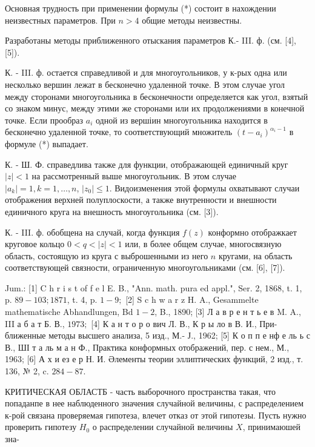 \documentclass[10pt]{article}
\begin{document}
Основная трудность при применении формулы (*) состоит в нахождении неизвестных параметров. При $n>4$ общие методы неизвестны.



Разработаны методы приближенного отыскания параметров К.- III. ф. (см. [4], [5]).



К. - III. ф. остается справедливой и для многоугольников, у к-рых одна или несколько вершин лежат в бесконечно удаленной точке. В этом случае угол между сторонами многоугольника в бесконечности определяется как угол, взятый со знаком минус, между этими же сторонами или их продолжениями в конечной точке. Если прообраз $a_{i}$ одной из вершіин многоугольника находится в бесконечно удаленной точке, то соответствующий множитель $\left(t-a_{i}\right)^{\alpha_{i}-1}$ в формуле (*) выпадает.



К. - Ш. Ф. справедлива также для функции, отображающей единичный круг $|z|<1$ на рассмотренный выше многоугольник. В этом случае $\left|a_{k}\right|=1, k=1, \ldots, n$, $\left|z_{0}\right| \leqslant 1$. Видоизменения этой формулы охватывают случаи отображения верхней полуплоскости, а также внутренности и внешности единичного круга на внешность многоугольника (см. [3]).



К. - III. ф. обобщена на случай, когда функция $f(z)$ конформно отображкает круговое кольцо $0<q<|z|<1$ или, в более общем случае, многосвязную область, состоящую из круга с выброшенными из него $n$ кругами, на область соответствующей связности, ограниченную многоугольниками (см. [6], [7]).



Jum.: [1] C h r i s t of f e l E. B., "Ann. math. pura ed appl.", Ser. 2, 1868, t. 1, p. $89-103 ; 1871$, t. 4, p. $1-9 ;$ [2] S c h w a r z H. A., Gesammelte mathematische Abhandlungen, Bd $1-2$, B., 1890; [3] Л а в р е н т ь е в M. A., III а б а т Б. В., $1973 ;$ [4] К а н т о р о вич Л. В., К р ы ло в В. И., При- ближенные методы высшего анализа, 5 изд., М.- Ј., 1962; [5] К о п п е нф е ль ь с В., ШІ т а ль м а н Ф., Практика конформных отображений, пер. с нем., М., 1963; [6] А х и ез е р Н. И. Әлементы теории эллиптических функций, 2 изд., т. 136, № 2, c. $284-87$.



КРИТИЧЕСКАЯ ОБЛАСТБ - часть выборочного пространства такая, что попаданпе в нее наблюденного значения случайной величины, с распределением к-рой связана проверяемая гипотеза, влечет отказ от этой гипотезы. Пусть нужно проверить гипотезу $H_{0}$ о распределении случайной величины $X$, принимаюшей зна-
\end{document}
